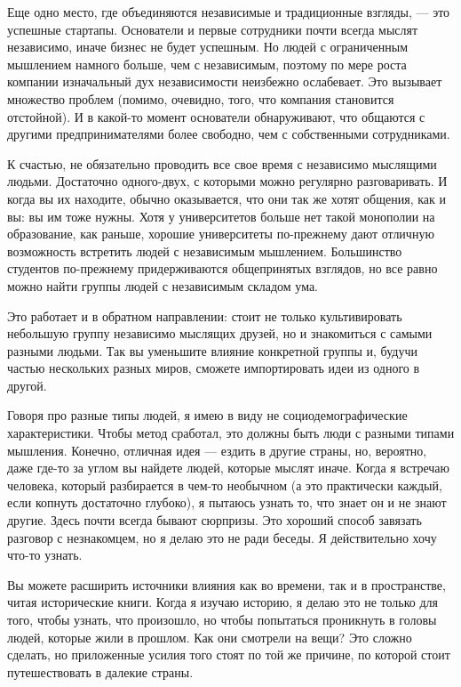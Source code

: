 \documentclass[ebook,12pt,oneside,openany]{memoir}
\begin{document}
Еще одно место, где объединяются независимые и традиционные взгляды, —
это успешные стартапы. Основатели и первые сотрудники почти всегда
мыслят независимо, иначе бизнес не будет успешным. Но людей с
ограниченным мышлением намного больше, чем с независимым, поэтому по
мере роста компании изначальный дух независимости неизбежно
ослабевает. Это вызывает множество проблем (помимо, очевидно, того,
что компания становится отстойной). И в какой-то момент основатели
обнаруживают, что общаются с другими предпринимателями более свободно,
чем с собственными сотрудниками.

К счастью, не обязательно проводить все свое время с независимо
мыслящими людьми. Достаточно одного-двух, с которыми можно регулярно
разговаривать. И когда вы их находите, обычно оказывается, что они так
же хотят общения, как и вы: вы им тоже нужны. Хотя у университетов
больше нет такой монополии на образование, как раньше, хорошие
университеты по-прежнему дают отличную возможность встретить людей с
независимым мышлением. Большинство студентов по-прежнему
придерживаются общепринятых взглядов, но все равно можно найти группы
людей с независимым складом ума.

Это работает и в обратном направлении: стоит не только культивировать
небольшую группу независимо мыслящих друзей, но и знакомиться с самыми
разными людьми. Так вы уменьшите влияние конкретной группы и, будучи
частью нескольких разных миров, сможете импортировать идеи из одного в
другой.

Говоря про разные типы людей, я имею в виду не социодемографические
характеристики. Чтобы метод сработал, это должны быть люди с разными
типами мышления. Конечно, отличная идея — ездить в другие страны, но,
вероятно, даже где-то за углом вы найдете людей, которые мыслят иначе.
Когда я встречаю человека, который разбирается в чем-то необычном (а
это практически каждый, если копнуть достаточно глубоко), я пытаюсь
узнать то, что знает он и не знают другие. Здесь почти всегда бывают
сюрпризы. Это хороший способ завязать разговор с незнакомцем, но я
делаю это не ради беседы. Я действительно хочу что-то узнать.

Вы можете расширить источники влияния как во времени, так и в
пространстве, читая исторические книги. Когда я изучаю историю, я
делаю это не только для того, чтобы узнать, что произошло, но чтобы
попытаться проникнуть в головы людей, которые жили в прошлом. Как они
смотрели на вещи? Это сложно сделать, но приложенные усилия того стоят
по той же причине, по которой стоит путешествовать в далекие страны.
\end{document}
